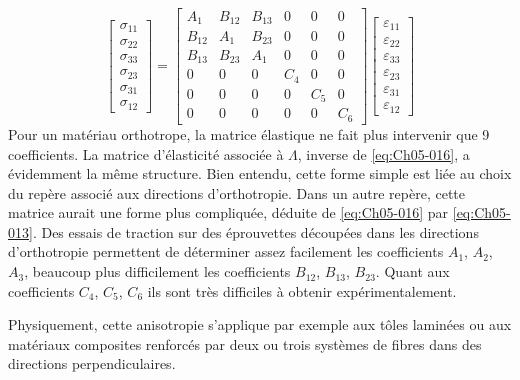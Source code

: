 \begin{equation}
    \begin{bmatrix}
        \sigma_{11}\\
        \sigma_{22}\\
        \sigma_{33}\\
        \sigma_{23}\\
        \sigma_{31}\\
        \sigma_{12}
    \end{bmatrix}
    =
    \begin{bmatrix}
        A_{1} & B_{12} & B_{13} & 0 & 0 & 0 \\
        B_{12} & A_{1} & B_{23} & 0 & 0 & 0 \\
        B_{13} & B_{23} & A_1 & 0 & 0 & 0 \\
        0 & 0 & 0 & C_{4} & 0 & 0 \\
        0 & 0 & 0 & 0 & C_{5} & 0 \\
        0 & 0 & 0 & 0 & 0 & C_{6}
    \end{bmatrix}
    \begin{bmatrix}
        \varepsilon_{11}\\
        \varepsilon_{22}\\
        \varepsilon_{33}\\
        \varepsilon_{23}\\
        \varepsilon_{31}\\
        \varepsilon_{12}
    \end{bmatrix}
    \label{eq:Ch05-016}
\end{equation}
Pour un matériau orthotrope, la matrice élastique ne fait plus intervenir que 9 coefficients.
La matrice d'élasticité associée à $\Lambda$, inverse de \eqref{eq:Ch05-016}, a évidemment la même structure.
Bien entendu, cette forme simple est liée au choix du repère associé aux directions d'orthotropie.
Dans un autre repère, cette matrice aurait une forme plus compliquée, déduite de \eqref{eq:Ch05-016} par \eqref{eq:Ch05-013}.
Des essais de traction sur des éprouvettes découpées dans les directions d'orthotropie permettent de déterminer assez facilement les coefficients $A_1$, $A_2$, $A_3$, beaucoup plus difficilement les coefficients $B_{12}$, $B_{13}$, $B_{23}$. 
Quant aux coefficients $C_4$, $C_5$, $C_6$ ils sont très difficiles à obtenir expérimentalement.

Physiquement, cette anisotropie s'applique par exemple aux tôles laminées ou aux matériaux composites renforcés par deux ou trois systèmes de fibres dans des directions perpendiculaires.

